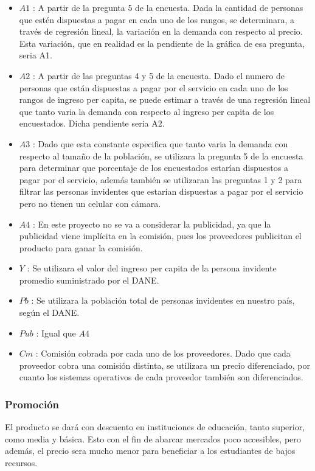 \documentclass[a4paper, 12pt, oneside]{article}
\begin{document}
	\begin{itemize}
	      \item $A1$ : A partir de la pregunta 5 de la encuesta. Dada la cantidad de personas que estén dispuestas a pagar en cada uno de los rangos, se determinara, a través de regresión
		           lineal, la variación en la demanda con respecto al precio. Esta variación, que en realidad es la pendiente de la gráfica de esa pregunta, seria A1.
	      \item $A2$ : A partir de las preguntas 4 y 5 de la encuesta. Dado el numero de personas que están dispuestas a pagar por el servicio en cada uno de los rangos de ingreso per              	     capita, se puede estimar a través de una regresión lineal que tanto varia la demanda con respecto al ingreso per capita de los encuestados. Dicha pendiente seria A2.
	      \item $A3$ : Dado que esta constante especifica que tanto varia la demanda con respecto al tamaño de la población, se utilizara la pregunta 5 de la encuesta para determinar que
			   porcentaje de los encuestados estarían dispuestos a pagar por el servicio, además también se utilizaran las preguntas 1 y 2 para filtrar las personas invidentes que
		           estarían dispuestas a pagar por el servicio pero no tienen un celular con cámara.
	      \item $A4$ : En este proyecto no se va a considerar la publicidad, ya que la publicidad viene implícita en la comisión, pues los proveedores publicitan el producto para ganar 
		           la comisión.
	      \item $Y$ : Se utilizara el valor del ingreso per capita de la persona invidente promedio suministrado por el DANE.
	      \item $Pb$ : Se utilizara la población total de personas invidentes en nuestro país, según el DANE.
	      \item $Pub$ : Igual que $A4$
	      \item $Cm$ : Comisión cobrada por cada uno de los proveedores. Dado que cada proveedor cobra una comisión distinta, se utilizara un precio diferenciado, por cuanto los sistemas
		     operativos de cada proveedor también son diferenciados.
	\end{itemize}

	\subsubsection{Promoción}
	El producto se dará con descuento en instituciones de educación, tanto superior, como media y básica. Esto con el fin de abarcar mercados poco accesibles, pero además, el precio sera
	mucho menor para beneficiar a los estudiantes de bajos recursos.
	
\end{document}
